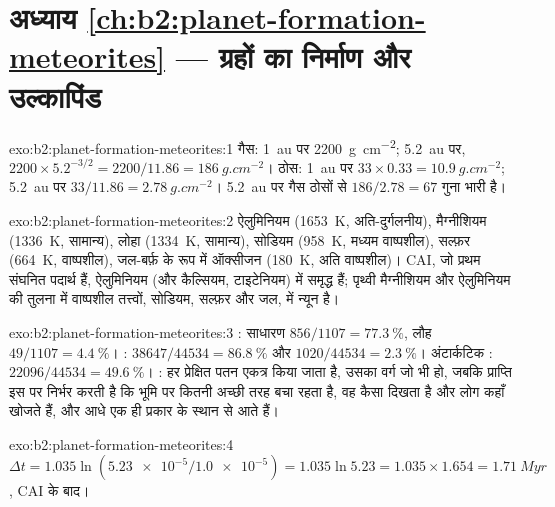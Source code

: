 \section*{अध्याय \ref{ch:b2:planet-formation-meteorites} --- ग्रहों का निर्माण और उल्कापिंड}

\begin{solution}{exo:b2:planet-formation-meteorites:1}
गैस: \qty{1}{au} पर \qty{2200}{g.cm^{-2}}; \qty{5.2}{au} पर,
$2200\times5.2^{-3/2} = 2200/11.86 = \qty{186}{g.cm^{-2}}$। ठोस:
\qty{1}{au} पर $33\times0.33 = \qty{10.9}{g.cm^{-2}}$;
\qty{5.2}{au} पर $33/11.86 = \qty{2.78}{g.cm^{-2}}$। \qty{5.2}{au} पर गैस ठोसों से
$186/2.78 = 67$ गुना भारी है।
\end{solution}

\begin{solution}{exo:b2:planet-formation-meteorites:2}
ऐलुमिनियम (\qty{1653}{K}, अति-दुर्गलनीय), मैग्नीशियम (\qty{1336}{K}, सामान्य),
लोहा (\qty{1334}{K}, सामान्य), सोडियम (\qty{958}{K}, मध्यम वाष्पशील), सल्फ़र
(\qty{664}{K}, वाष्पशील), जल-बर्फ़ के रूप में ऑक्सीजन (\qty{180}{K}, अति वाष्पशील)।
CAI, जो प्रथम संघनित पदार्थ हैं, ऐलुमिनियम (और कैल्सियम, टाइटेनियम) में समृद्ध हैं;
पृथ्वी मैग्नीशियम और ऐलुमिनियम की तुलना में वाष्पशील तत्त्वों, सोडियम, सल्फ़र और जल,
में न्यून है।
\end{solution}

\begin{solution}{exo:b2:planet-formation-meteorites:3}
: साधारण  $856/1107 = \qty{77.3}{\percent}$, लौह
$49/1107 = \qty{4.4}{\percent}$। : $38647/44534 = \qty{86.8}{\percent}$ और
$1020/44534 = \qty{2.3}{\percent}$। अंटार्कटिक : $22096/44534 =
\qty{49.6}{\percent}$। : हर प्रेक्षित पतन एकत्र किया जाता है, उसका
वर्ग जो भी हो, जबकि प्राप्ति इस पर निर्भर करती है कि  भूमि पर कितनी अच्छी तरह बचा रहता है,
वह कैसा दिखता है और लोग कहाँ खोजते हैं, और आधे  एक ही प्रकार के
स्थान से आते हैं।
\end{solution}

\begin{solution}{exo:b2:planet-formation-meteorites:4}
$\Delta t = 1.035\ln(\num{5.23e-5}/\num{1.0e-5}) = 1.035\ln 5.23 =
1.035\times1.654 = \qty{1.71}{Myr}$, CAI के बाद।
\end{solution}

